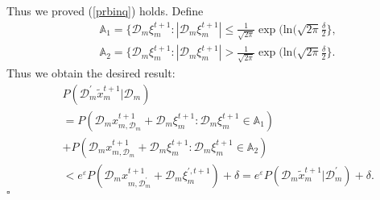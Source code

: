 Thus we proved (\ref{prbinq}) holds. Define
\begin{eqnarray*}
&&\mathbb{A}_1=\{
\mathcal{D}_m\xi_m^{t+1}:|\mathcal{D}_m\xi_m^{t+1}|\leq\frac{1}{\sqrt{2\pi}}\exp(\text{ln}(\sqrt{2\pi}\frac{\delta}{2}
\},\\
&&\mathbb{A}_2=\{
\mathcal{D}_m\xi_m^{t+1}:|\mathcal{D}_m\xi_m^{t+1}|>\frac{1}{\sqrt{2\pi}}\exp(\text{ln}(\sqrt{2\pi}\frac{\delta}{2}
\}.
\end{eqnarray*}
Thus we obtain the desired result:
\begin{eqnarray*}
&&P(\mathcal{D}_m^{\prime}\tilde{x}_m^{t+1}|\mathcal{D}_m)\\
&&=
P(\mathcal{D}_mx_{m,\mathcal{D}_m}^{t+1}+\mathcal{D}_m\xi_m^{t+1}:\mathcal{D}_m\xi_m^{t+1}\in\mathbb{A}_1)\\
&&+P(\mathcal{D}_mx_{m,\mathcal{D}_m}^{t+1}+\mathcal{D}_m\xi_m^{t+1}:\mathcal{D}_m\xi_m^{t+1}\in\mathbb{A}_2)\\
&&<e^{\varepsilon}P(\mathcal{D}_mx_{m,\mathcal{D}_m^{\prime}}^{t+1}
+\mathcal{D}_m\xi_m^{\prime,t+1})+\delta=e^{\varepsilon}P(\mathcal{D}_m\tilde{x}_m^{t+1}|\mathcal{D}_m^{\prime})+\delta.
\end{eqnarray*}
\hfill$\square$ 